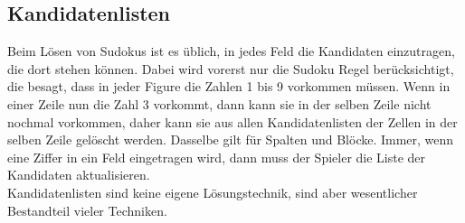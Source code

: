 \subsection{Kandidatenlisten}
\label{Kandidatenlisten}
Beim Lösen von Sudokus ist es üblich, in jedes Feld die Kandidaten einzutragen, die dort stehen können. Dabei wird vorerst nur die Sudoku Regel berücksichtigt, die besagt, dass in jeder Figure die Zahlen 1 bis 9 vorkommen müssen. Wenn in einer Zeile nun die Zahl 3 vorkommt, dann kann sie in der selben Zeile nicht nochmal vorkommen, daher kann sie aus allen Kandidatenlisten der Zellen in der selben Zeile gelöscht werden. Dasselbe gilt für Spalten und Blöcke. Immer, wenn eine Ziffer in ein Feld eingetragen wird, dann muss der Spieler die Liste der Kandidaten aktualisieren.\\
Kandidatenlisten sind keine eigene Lösungstechnik, sind aber wesentlicher Bestandteil vieler Techniken.